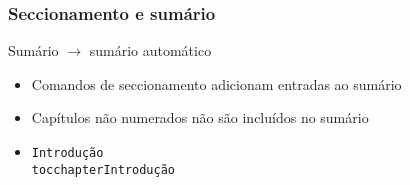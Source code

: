 \begin{frame}
  \frametitle{Seccionamento e sumário}

  \begin{block}{Sumário}\medskip
    \blue{\texttt{\string\tableofcontents}} $\to$ sumário automático

    \begin{itemize}
    \item Comandos de seccionamento adicionam entradas ao sumário
    \end{itemize}
  \end{block}


  \bigskip
  \begin{dica}
    \begin{itemize}
    \item Capítulos não numerados não são incluídos no sumário
    \item \small
      \texttt{\blue{\string\chapter*}\ac{}Introdução\fc{}
        \quad{} \\
    \purple{\string\addcontentsline}\ac{}toc\fc{}\ac{}chapter\fc{}\ac{}Introdução\fc{}}
    \end{itemize}
  \end{dica}

\end{frame}

